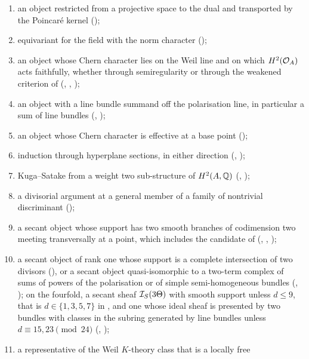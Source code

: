 \begin{theorem}[Closure]
\begin{enumerate}[label=\textup{(\roman*)},leftmargin=2.8em,itemsep=4pt]
  \begin{enumerate}[label=\textup{(\alph*)},nosep,leftmargin=2.2em]
  \item an object restricted from a projective space to the dual and
    transported by the Poincar\'e kernel ();
  \item equivariant for the field with the norm character
    ();
  \item an object whose Chern character lies on the Weil line and on which
    $H^{2}(\mathcal{O}_{A})$ acts faithfully, whether through semiregularity or
    through the weakened criterion of \cite[Question~11.4]{Mar25b}
    (, , );
  \item an object with a line bundle summand off the polarisation line, in
    particular a sum of line bundles (,
    );
  \item an object whose Chern character is effective at a base point
    ();
  \item induction through hyperplane sections, in either direction
    (, );
  \item Kuga--Satake from a weight two sub-structure of $H^{2}(A,\mathbb{Q})$
    (, );
  \item a divisorial argument at a general member of a family of nontrivial
    discriminant ();
  \item a secant object whose support has two smooth branches of codimension
    two meeting transversally at a point, which includes the candidate of
    \cite[Section~12]{Mar25b} (,
    , );
  \item a secant object of rank one whose support is a complete intersection
    of two divisors (), or a secant object quasi-isomorphic to
    a two-term complex of sums of powers of the polarisation or of simple
    semi-homogeneous bundles (, ); on
    the fourfold, a secant sheaf $\mathcal{I}_{S}(3\Theta)$ with smooth support
    unless $d\le9$, that is $d\in\{1,3,5,7\}$ in , and
    one whose ideal sheaf is presented by two bundles
    with classes in the subring generated by line bundles unless
    $d\equiv15,23\pmod{24}$ (,
    );
  \item a representative of the Weil $K$-theory class that is a locally free

\end{enumerate}
\end{enumerate}
\end{theorem}
